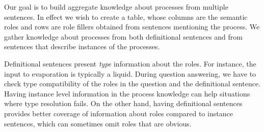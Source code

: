 Our goal is to build aggregate knowledge about processes from multiple sentences. 
In effect we wish to create a table, whose columns are the semantic roles and rows are role fillers obtained from sentences mentioning the process.
We gather knowledge about processes from both definitional sentences and from sentences that describe instances of the processes. 

Definitional sentences present {\em type} information about the roles. 
For instance, the input to evaporation is typically a liquid. 
During question answering, we have to check type compatibility of the roles in the question and the definitional sentence. 
Having instance level information in the process knowledge can help situations where type resolution fails. 
On the other hand, having definitional sentences provides better coverage of information about roles compared to instance sentences,
which can sometimes omit roles that are obvious. 








